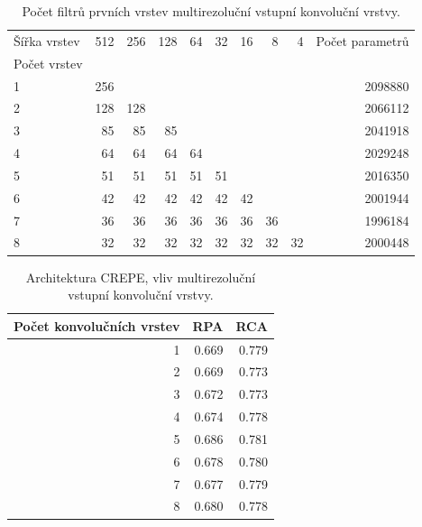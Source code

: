 \begin{table}[h!]
\centering
    \begin{tabular}{lrrrrrrrrr}
    \toprule
    Šířka vrstev & 512 & 256 & 128 & 64 & 32 & 16 & 8  & 4  & Počet parametrů  \\
    Počet vrstev & {} & {} & {} & {} & {} & {} & {}  & {}  & {}  \\
    \midrule
    1                   & 256 &     &     &    &    &    &    &    & 2098880 \\
    2                   & 128 & 128 &     &    &    &    &    &    & 2066112 \\
    3                   & 85  & 85  & 85  &    &    &    &    &    & 2041918 \\
    4                   & 64  & 64  & 64  & 64 &    &    &    &    & 2029248 \\
    5                   & 51  & 51  & 51  & 51 & 51 &    &    &    & 2016350 \\
    6                   & 42  & 42  & 42  & 42 & 42 & 42 &    &    & 2001944 \\
    7                   & 36  & 36  & 36  & 36 & 36 & 36 & 36 &    & 1996184 \\
    8                   & 32  & 32  & 32  & 32 & 32 & 32 & 32 & 32 & 2000448 \\
    \bottomrule
    \end{tabular}
\caption{Počet filtrů prvních vrstev multirezoluční vstupní konvoluční vrstvy.}\label{tab:crepe_velikosti_multirozliseni}
\end{table}

\begin{table}[h!]
\centering
    \begin{tabular}{rrr}
    \toprule
    Počet konvolučních vrstev &   RPA &   RCA \\
    \midrule
                            1 & 0.669 & 0.779 \\
                            2 & 0.669 & 0.773 \\
                            3 & 0.672 & 0.773 \\
                            4 & 0.674 & 0.778 \\
                            5 & 0.686 & 0.781 \\
                            6 & 0.678 & 0.780 \\
                            7 & 0.677 & 0.779 \\
                            8 & 0.680 & 0.778 \\
    \bottomrule
    \end{tabular}
\caption{Architektura CREPE, vliv multirezoluční vstupní konvoluční vrstvy.}\label{tab:crepe_multirozliseni}
\end{table}

